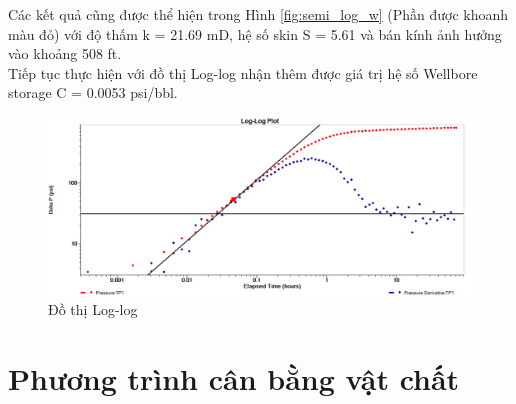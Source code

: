 \documentclass[12pt,a4paper]{report}
\begin{document}
    \newline
Các kết quả cũng được thể hiện trong Hình \ref{fig:semi_log_w} (Phần được khoanh màu đỏ) với độ thấm k = 21.69 mD, hệ số skin S = 5.61 và bán kính ảnh hưởng vào khoảng 508 ft.\\
Tiếp tục thực hiện với đồ thị Log-log nhận thêm được giá trị hệ số Wellbore storage C = 0.0053 psi/bbl. 
	\begin{figure}[h]
    	\centering
        \includegraphics[scale=.4]{welltest/loglog.png}
        \caption{Đồ thị Log-log}
        \label{fig:loglog}
    \end{figure}
\section{Phương trình cân bằng vật chất}
\end{document}
